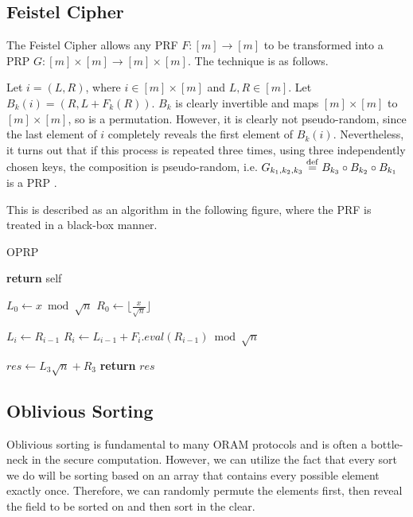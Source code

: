 \subsection{Feistel Cipher}

The Feistel Cipher allows any PRF $F : [m] \rightarrow[m]$ to be transformed
into a PRP $G : [m] \times [m] \rightarrow [m] \times [m]$. The technique is as follows.

Let $i = (L, R)$, where $i \in [m] \times [m]$ and $L, R \in [m]$.
Let $B_k(i) = (R, L + F_k(R))$.
$B_k$ is clearly invertible and maps $[m] \times [m]$ to $[m] \times [m]$, 
so is a permutation.
However, it is clearly not pseudo-random, since the last element of $i$ 
completely reveals the first element of $B_k(i)$.
Nevertheless, it turns out that if this process is repeated three times,
using three independently chosen keys, the composition is pseudo-random,
i.e. $G_{k_1, k_2, k_3} \stackrel{\mathrm{def}}{=} B_{k_3} \circ B_{k_2} \circ B_{k_1}$ is a PRP
\cite{luby1988construct}.

This is described as an algorithm in the following figure,
where the PRF is treated in a black-box manner.

\begin{algorithm}
\caption{OPRP}
\label{alg:oprp}
\begin{algorithmic}[1]

\State \textbf{return} self   
\EndProcedure

\State

\State $L_0 \gets x \bmod \sqrt{n}$
\State $R_0 \gets \lfloor \frac{x}{\sqrt{n}} \rfloor$

\State $L_i \gets R_{i-1}$
\State $R_i \gets L_{i-1} + F_{i}.eval(R_{i-1}) \bmod \sqrt{n}$
\EndFor

\State $res \gets L_3\sqrt{n} + R_3$
\State \textbf{return} $res$
\EndProcedure

\end{algorithmic}
\end{algorithm}
\subsection{Oblivious Sorting}

Oblivious sorting is fundamental to many ORAM protocols and is often
a bottle-neck in the secure computation.
However, we can utilize the fact that every sort we do will be sorting
based on an array that contains every possible element exactly once.
Therefore, we can randomly permute the elements first,
then reveal the field to be sorted on and then sort in the clear.

